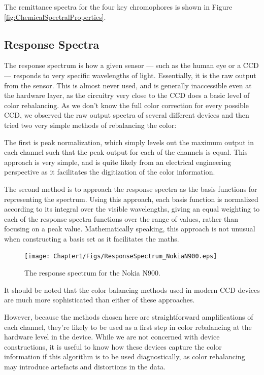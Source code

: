 The remittance spectra for the four key chromophores is shown in Figure \ref{fig:ChemicalSpectralProperties}. 

\subsection{Response Spectra}

The response spectrum is how a given sensor --- such as the human eye or a CCD --- responds to very specific wavelengths of light. Essentially, it is the raw output from the sensor. This is almost never used, and is generally inaccessible even at the hardware layer, as the circuitry very close to the CCD does a basic level of color rebalancing. As we don't know the full color correction for every possible CCD, we observed the raw output spectra of several different devices and then tried two very simple methods of rebalancing the color:

The first is peak normalization, which simply levels out the maximum output in each channel such that the peak output for each of the channels is equal. This approach is very simple, and is quite likely from an electrical engineering perspective as it facilitates the digitization of the color information.

The second method is to approach the response spectra as the basis functions for representing the spectrum. Using this approach, each basis function is normalized according to its integral over the visible wavelengths, giving an equal weighting to each of the response spectra functions over the range of values, rather than focusing on a peak value. Mathematically speaking, this approach is not unusual when constructing a basis set as it facilitates the maths.

\begin{figure}[h!]
  \centering
    \texttt{[image: Chapter1/Figs/ResponseSpectrum\_NokiaN900.eps]}
    \caption{The response spectrum for the Nokia N900. }  \label{fig:ResponseSpectumNokia}
\end{figure}



It should be noted that the color balancing methods used in modern CCD devices are much more sophisticated than either of these approaches.

However, because the methods chosen here are straightforward amplifications of each channel, they're likely to be used as a first step in color rebalancing at the hardware level in the device. While we are not concerned with device constructions, it is useful to know how these devices capture the color information if this algorithm is to be used diagnostically, as color rebalancing may introduce artefacts and distortions in the data.


